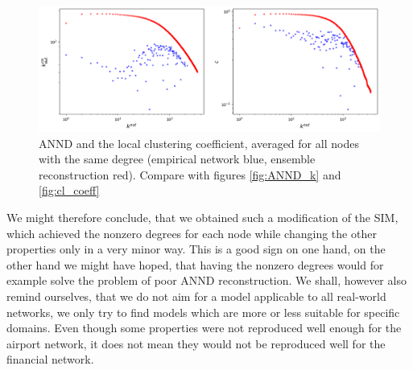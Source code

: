 \begin{figure}[!ht]
    \centering
    \includegraphics[scale=0.5]{../img/corrected/annd_k_cl_coeff_k.png}
    \caption{ANND and the local clustering coefficient, averaged for all nodes with the same degree (empirical network blue, ensemble reconstruction red). Compare with figures \ref*{fig:ANND_k} and \ref*{fig:cl_coeff}}
    \label{fig:ANND_k_cl_coeff_k}
\end{figure}

We might therefore conclude, that we obtained such a modification of the SIM, which achieved the nonzero degrees for each node while changing the other properties only in a very minor way. This is a good sign on one hand, on the other hand we might have hoped, that having the nonzero degrees would for example solve the problem of poor ANND reconstruction. We shall, however also remind ourselves, that we do not aim for a model applicable to all real-world networks, we only try to find models which are more or less suitable for specific domains. Even though some properties were not reproduced well enough for the airport network, it does not mean they would not be reproduced well for the financial network.